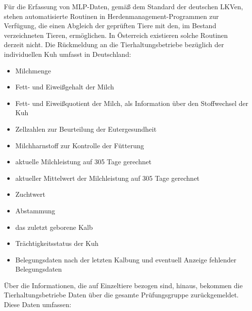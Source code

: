 Für die Erfassung von MLP-Daten, gemäß dem Standard der deutschen LKVen, stehen automatisierte Routinen in Herdenmanagement-Programmen zur Verfügung, die einen Abgleich der geprüften Tiere mit den, im Bestand verzeichneten Tieren, ermöglichen. In Österreich existieren solche Routinen derzeit nicht. Die Rückmeldung an die Tierhaltungsbetriebe bezüglich der individuellen Kuh umfasst in Deutschland:
\begin{itemize}
	\item Milchmenge \autocite{landeskontrollverband_schleswig-holstein_e.v._milchleistungsprufung_????}
	\item Fett- und Eiweißgehalt der Milch \autocite{landeskontrollverband_schleswig-holstein_e.v._milchleistungsprufung_????}
	\item Fett- und Eiweißquotient der Milch, als Information über den Stoffwechsel der Kuh \autocite{landeskontrollverband_schleswig-holstein_e.v._milchleistungsprufung_????}
	\item Zellzahlen zur Beurteilung der Eutergesundheit \autocite{landeskontrollverband_schleswig-holstein_e.v._milchleistungsprufung_????}
	\item Milchharnstoff zur Kontrolle der Fütterung \autocite{landeskontrollverband_schleswig-holstein_e.v._milchleistungsprufung_????}
	\item aktuelle Milchleistung auf 305 Tage gerechnet \autocite{landeskontrollverband_schleswig-holstein_e.v._milchleistungsprufung_????}
	\item aktueller Mittelwert der Milchleistung auf 305 Tage gerechnet \autocite{landeskontrollverband_schleswig-holstein_e.v._milchleistungsprufung_????}
	\item Zuchtwert \autocite{landeskontrollverband_schleswig-holstein_e.v._milchleistungsprufung_????}
	\item Abstammung \autocite{landeskontrollverband_schleswig-holstein_e.v._milchleistungsprufung_????}
	\item das zuletzt geborene Kalb \autocite{landeskontrollverband_schleswig-holstein_e.v._milchleistungsprufung_????}
	\item Trächtigkeitsstatus der Kuh \autocite{landeskontrollverband_schleswig-holstein_e.v._milchleistungsprufung_????}
	\item Belegungsdaten nach der letzten Kalbung und eventuell Anzeige fehlender Belegungsdaten \autocite{landeskontrollverband_schleswig-holstein_e.v._milchleistungsprufung_????}
\end{itemize}
Über die Informationen, die auf Einzeltiere bezogen sind, hinaus, bekommen die Tierhaltungsbetriebe Daten über die gesamte Prüfungsgruppe zurückgemeldet. Diese Daten umfassen: 
